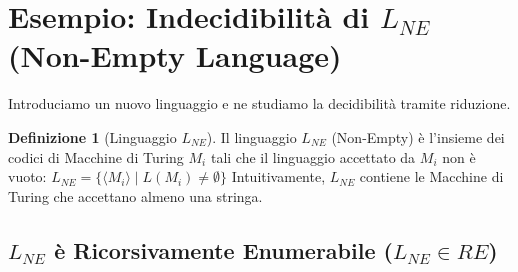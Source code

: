 \documentclass[a4paper]{article}
\theoremstyle{definition} %
\newtheorem{definition}[theorem]{Definizione}
\begin{document}
\section{Esempio: Indecidibilità di $L_{NE}$ (Non-Empty Language)}

Introduciamo un nuovo linguaggio e ne studiamo la decidibilità tramite riduzione.

\begin{definition}[Linguaggio $L_{NE}$]
Il linguaggio $L_{NE}$ (Non-Empty) è l'insieme dei codici di Macchine di Turing $M_i$ tali che il linguaggio accettato da $M_i$ non è vuoto:
$L_{NE} = \{ \langle M_i \rangle \mid L(M_i) \neq \emptyset \}$
Intuitivamente, $L_{NE}$ contiene le Macchine di Turing che accettano almeno una stringa.
\end{definition}

\subsection{$L_{NE}$ è Ricorsivamente Enumerabile ($L_{NE} \in RE$)}
\end{document}
